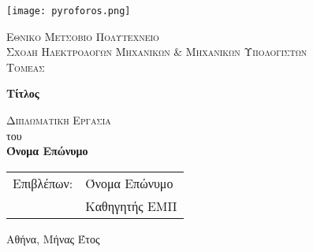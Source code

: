 \begin{titlepage}
    \begin{center}
        \vspace*{-1cm}
        
        \texttt{[image: pyroforos.png]}
        
        \Large
        \textsc{Εθνικο Μετσοβιο Πολυτεχνειο}\\
        \large
        \textsc{Σχολη Ηλεκτρολογων Μηχανικων \& Μηχανικων Υπολογιστων}\\
        \textsc{Τομεας}
        \vspace{2.5cm}
        
        \Huge
        \textbf{Τίτλος}
        
        \vspace{3cm}
        \Large
        \textsc{Διπλωματικη Εργασια}\\
        του\\

        \LARGE
        \textbf{Όνομα Επώνυμο}
        
    \end{center}
    
    \vspace{3cm}
    
    \begin{tabular}{ll}
		Επιβλέπων: & Όνομα Επώνυμο \\
		 & Καθηγητής ΕΜΠ
	\end{tabular}
	
    \vfill
    
    \begin{center}
    	 Αθήνα, Μήνας Έτος	
    \end{center}
\end{titlepage}